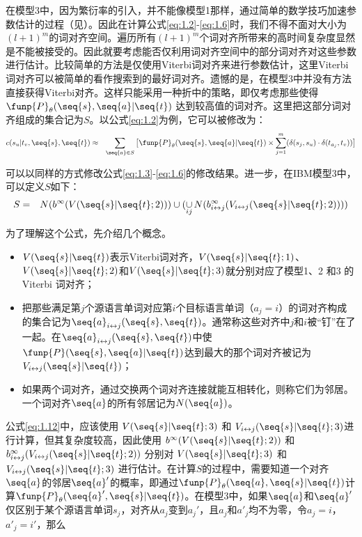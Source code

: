 \begin{appendices}
\parinterval 在模型3中，因为繁衍率的引入，并不能像模型1那样，通过简单的数学技巧加速参数估计的过程（见{\chapterfive}）。因此在计算公式\eqref{eq:1.2}-\eqref{eq:1.6}时，我们不得不面对大小为$(l+1)^m$的词对齐空间。遍历所有$(l+1)^m$个词对齐所带来的高时间复杂度显然是不能被接受的。因此就要考虑能否仅利用词对齐空间中的部分词对齐对这些参数进行估计。比较简单的方法是仅使用Viterbi词对齐来进行参数估计，这里Viterbi 词对齐可以被简单的看作搜索到的最好词对齐。遗憾的是，在模型3中并没有方法直接获得Viterbi对齐。这样只能采用一种折中的策略，即仅考虑那些使得$\funp{P}_{\theta}(\seq{s},\seq{a}|\seq{t})$ 达到较高值的词对齐。这里把这部分词对齐组成的集合记为$S$。以公式\eqref{eq:1.2}为例，它可以被修改为：
\begin{eqnarray}
c(s_u|t_v,\seq{s},\seq{t}) &\approx & \sum_{\seq{a} \in S}\big[\funp{P}_{\theta}(\seq{s},\seq{a}|\seq{t}) \times \sum_{j=1}^{m}(\delta(s_j,s_u) \cdot \delta(t_{a_{j}},t_v)) \big]
\label{eq:1.11}
\end{eqnarray}

\parinterval 可以以同样的方式修改公式\eqref{eq:1.3}-\eqref{eq:1.6}的修改结果。进一步，在IBM模型3中，可以定义$S$如下：
\begin{eqnarray}
S &=& N(b^{\infty}(V(\seq{s}|\seq{t};2))) \cup (\mathop{\cup}\limits_{ij} N(b_{i \leftrightarrow j}^{\infty}(V_{i \leftrightarrow j}(\seq{s}|\seq{t};2))))
\label{eq:1.12}
\end{eqnarray}

\parinterval 为了理解这个公式，先介绍几个概念。
\begin{itemize}
\item $V(\seq{s}|\seq{t})$表示Viterbi词对齐，$V(\seq{s}|\seq{t};1)$、$V(\seq{s}|\seq{t};2)$和$V(\seq{s}|\seq{t};3)$就分别对应了模型1、2 和3 的Viterbi 词对齐；
\item 把那些满足第$j$个源语言单词对应第$i$个目标语言单词（$a_j=i$）的词对齐构成的集合记为$\seq{a}_{i \leftrightarrow j}(\seq{s},\seq{t})$。通常称这些对齐中$j$和$i$被``钉''在了一起。在$\seq{a}_{i \leftrightarrow j}(\seq{s},\seq{t})$中使$\funp{P}(\seq{s},\seq{a}| \seq{t})$达到最大的那个词对齐被记为$V_{i \leftrightarrow j}(\seq{s}|\seq{t})$；
\item 如果两个词对齐，通过交换两个词对齐连接就能互相转化，则称它们为邻居。一个词对齐$\seq{a}$的所有邻居记为$N(\seq{a})$。
\end{itemize}

\vspace{0.5em}
\parinterval 公式\eqref{eq:1.12}中，应该使用 $V(\seq{s}|\seq{t};3)$ 和 $V_{i \leftrightarrow j}(\seq{s}|\seq{t};3)$进行计算，但其复杂度较高，因此使用 $b^{\infty}(V(\seq{s}|\seq{t};2))$ 和 $b_{i \leftrightarrow j}^{\infty}(V_{i \leftrightarrow j}(\seq{s}|\seq{t};2))$ 分别对 $V(\seq{s}|\seq{t};3)$ 和 $V_{i \leftrightarrow j}(\seq{s}|\seq{t};3)$ 进行估计。在计算$S$的过程中，需要知道一个对齐$\seq{a}$的邻居$\seq{a}'$的概率，即通过$\funp{P}_{\theta}(\seq{a},\seq{s}|\seq{t})$计算$\funp{P}_{\theta}(\seq{a}',\seq{s}|\seq{t})$。在模型3中，如果$\seq{a}$和$\seq{a}'$仅区别于某个源语言单词$s_j$，对齐从$a_j$变到$a_{j}'$，且$a_j$和$a'_j$均不为零，令$a_j=i$，$a'_{j}=i'$，那么


\end{appendices}
